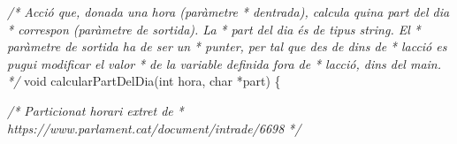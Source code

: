 \documentclass[
]{book}
\newenvironment{Shaded}{\begin{snugshade}}{\end{snugshade}}
\newcommand{\CommentTok}[1]{\textcolor[rgb]{0.56,0.35,0.01}{\textit{#1}}}
\newcommand{\DataTypeTok}[1]{\textcolor[rgb]{0.13,0.29,0.53}{#1}}
\newcommand{\NormalTok}[1]{#1}
\begin{document}
\begin{Shaded}
\begin{Highlighting}[]
\CommentTok{/* Acció que, donada una hora (paràmetre}
\CommentTok{ * d\textquotesingle{}entrada), calcula quina part del dia}
\CommentTok{ * correspon (paràmetre de sortida). La}
\CommentTok{ * part del dia és de tipus string. El}
\CommentTok{ * paràmetre de sortida ha de ser un }
\CommentTok{ * punter, per tal que des de dins de}
\CommentTok{ * l\textquotesingle{}acció es pugui modificar el valor}
\CommentTok{ * de la variable definida fora de }
\CommentTok{ * l\textquotesingle{}acció, dins del main.}
\CommentTok{ */}
\DataTypeTok{void}\NormalTok{ calcularPartDelDia(}\DataTypeTok{int}\NormalTok{ hora, }\DataTypeTok{char}\NormalTok{ *part) \{}

    \CommentTok{/* Particionat horari extret de}
\CommentTok{     * https://www.parlament.cat/document/intrade/6698}
\CommentTok{     */}


\end{Highlighting}
\end{Shaded}
\end{document}
